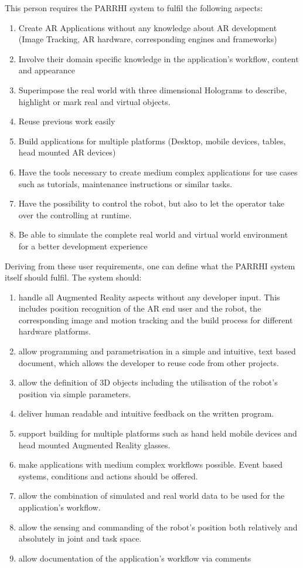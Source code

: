 This person requires the PARRHI system to fulfil the following aspects:
\begin{enumerate}
	\setlength\itemsep{-1em}
	\item Create AR Applications without any knowledge about AR development (Image Tracking, AR hardware, corresponding engines and frameworks)
	\item Involve their domain specific knowledge in the application's workflow, content and appearance
	\item Superimpose the real world with three dimensional Holograms to describe, highlight or mark real and virtual objects.
	\item Reuse previous work easily
	\item Build applications for multiple platforms (Desktop, mobile devices, tables, head mounted AR devices) 
	\item Have the tools necessary to create medium complex applications for use cases such as tutorials, maintenance instructions or similar tasks.
	\item Have the possibility to control the robot, but also to let the operator take over the controlling at runtime.
	\item Be able to simulate the complete real world and virtual world environment for a better development experience
\end{enumerate}

Deriving from these user requirements, one can define what the PARRHI system itself should fulfil. The system should:

\begin{enumerate}
	\setlength\itemsep{-1em}
	\item handle all Augmented Reality aspects without any developer input. This includes position recognition of the AR end user and the robot, the corresponding image and motion tracking and the build process for different hardware platforms.
	\item allow programming and parametrisation in a simple and intuitive, text based document, which allows the developer to reuse code from other projects.
	\item allow the definition of 3D objects including the utilisation of the robot's position via simple parameters.
	\item deliver human readable and intuitive feedback on the written program.
	\item support building for multiple platforms such as hand held mobile devices and head mounted Augmented Reality glasses.
	\item make applications with medium complex workflows possible. Event based systems, conditions and actions should be offered.
	\item allow the combination of simulated and real world data to be used for the application's workflow.
	\item allow the sensing and commanding of the robot's position both relatively and absolutely in joint and task space.
	\item allow documentation of the application's workflow via comments
\end{enumerate}

